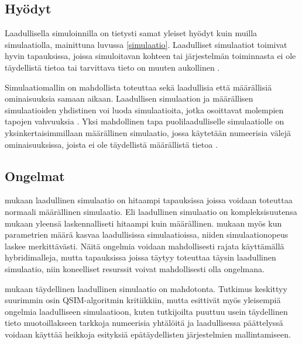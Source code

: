 \documentclass[utf8]{gradu3}
\begin{document}
\subsection{Hyödyt}
Laadullisella simuloinnilla on tietysti samat yleiset hyödyt kuin muilla simulaatiolla, mainittuna luvussa \ref{simulaatio}. Laadulliset simulaatiot toimivat hyvin tapauksissa, joissa simuloitavan kohteen tai järjestelmän toiminnasta ei ole täydellistä tietoa tai tarvittava tieto on muuten aukollinen \parencite{kuipers1986qualitative}. 

Simulaatiomallin on mahdollista toteuttaa sekä laadullisia että määrällisiä ominaisuuksia samaan aikaan. Laadullisen simulaation ja määrällisen simulaatioiden yhdistinen voi luoda simulaatioita, jotka osoittavat molempien tapojen vahvuuksia \parencite{semiHybrid1997qualitative}. Yksi mahdollinen tapa puolilaadulliselle simulaatiolle on yksinkertaisimmillaan määrällinen simulaatio, jossa käytetään numeerisia välejä ominaisuuksissa, joista ei ole täydellistä määrällistä tietoa \parencite{semiHybrid1997qualitative}.

\subsection{Ongelmat}
\textcite{QualSimTheoryApplications2013} mukaan laadullinen simulaatio on hitaampi tapauksissa joissa voidaan toteuttaa normaali määrällinen simulaatio. Eli laadullinen simulaatio on kompleksisuutensa mukaan yleensä laskennalliseti hitaampi kuin määrällinen. 
\textcite{QualSimTheoryApplications2013} mukaan myös kun parametrien määrä kasvaa laadullisissa simulaatioissa, niiden simulaationopeus laskee merkittävästi. 
Näitä ongelmia voidaan mahdollisesti rajata käyttämällä hybridimalleja, mutta 
tapauksissa joissa täytyy toteuttaa täysin laadullinen simulaatio, niin koneelliset resurssit voivat mahdollisesti olla ongelmana. 

\textcite{soundQualSimImpossible} mukaan täydellinen laadullinen simulaatio on mahdotonta.
Tutkimus keskittyy suurimmin osin QSIM-algoritmin kritiikkiin, mutta \textcite{soundQualSimImpossible} esittivät myös yleisempiä ongelmia laadulliseen simulaatioon, kuten tutkijoilta puuttuu usein täydellinen tieto muotoillakseen tarkkoja numeerisia yhtälöitä ja laadullisessa päättelyssä voidaan käyttää heikkoja esityksiä epätäydellisten järjestelmien mallintamiseen.
\end{document}
